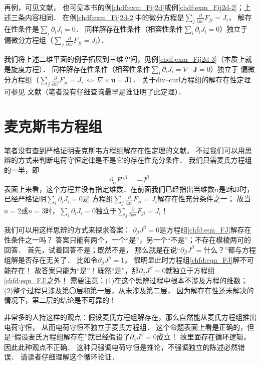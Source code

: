 再例，可见文献\parencite[p.16]{courant_hilbert-v2}，
也可见本书的例\ref{chdf:exm_Fij2d}或例\ref{chdf:exm_Fij2d-2}；上述三条内容相同．
在例\ref{chdf:exm_Fij2d-2}中的微分方程是$\sum_{j}\frac{\partial}{\partial x^j} F_{ji} = J_{i} $，
解存在性条件是$\sum_{i} \partial_i J_i = 0$．
同样解存在性条件（相容性条件$\sum_{i} \partial_i J_i = 0$）独立于
偏微分方程组（$\sum_{j}\frac{\partial}{\partial x^j} F_{ji} = J_{i} $）．


我们将上述二维平面的例子拓展到三维空间，见例\ref{chdf:exm_Fij2d-3}（本质上就是旋度方程）．
同样解存在性条件（相容性条件$\sum_{i} \partial_i J_i =\nabla \cdot \boldsymbol{J}= 0 $）独立于
偏微分方程组（$\sum_{j}\frac{\partial}{\partial x^j} F_{ji} = J_{i} {\ \Longleftrightarrow \ }
\nabla\times \boldsymbol{u} = \boldsymbol{J} $）．
关于div--curl方程组的解存在性定理可参见
文献\parencite{aramaki-2014}（笔者没有仔细查询最早是谁证明了此定理）．


\section{麦克斯韦方程组}
笔者没有查到严格证明麦克斯韦方程组解存在性定理的文献，
不过我们可以用思辨的方式来判断电荷守恒定律是不是它的存在性充分条件．
我们只需麦氏方程组的一半，即
\begin{equation}\label{chfd:eqn_FJ}
	\partial_{\alpha} F^{\alpha\beta} = - J^{\beta} .
\end{equation}
表面上来看，这个方程并没有指定维数．在前面我们已经指出当维数$n$是2和3时，
已经严格证明$\sum_{i} \partial_i J_i =0$是
方程组$\sum_{j}\frac{\partial}{\partial x^j} F_{ji} = J_{i}$解存在性充分条件之一；
故当$n=2$或$n=3$时，$\sum_{i} \partial_i J_i =0$独立于$\sum_{j}\frac{\partial}{\partial x^j} F_{ji} = J_{i}$！

我们可以用这样思辨的方式来探求答案：
$\partial_{\beta} J^{\beta}=0$是方程组\eqref{chfd:eqn_FJ}解存在性条件之一吗？
答案只能有两个，一个“是”，另一个“不是”；不存在模棱两可的回答．
首先，试着回答不是；既然不是，
那么就是在说“$\partial_{\beta} J^{\beta}=\text{什么？}$”都与方程组解是否存在无关了．
比如令$\partial_{\beta} J^{\beta}=1$，
很明显此时方程组\eqref{chfd:eqn_FJ}解不可能存在！
故答案只能为“是”！既然“是”，那$\partial_{\beta} J^{\beta}=0$就独立于方程组\eqref{chfd:eqn_FJ}之外！
需要注意：(1)在这个思辨过程中根本不涉及方程的维数；
(2)整个过程只涉及第〇层和第一层，从未涉及第二层，
因为解存在性还未解决的情况下，第二层的结论是不可靠的！


非常多的人持这样的观点：假设麦氏方程组解存在，那么自然能从麦氏方程组推出电荷守恒，
从而电荷守恒不独立于麦氏方程组．
这个命题表面上看是正确的，但是“假设麦氏方程组解存在”就已经假设了$\partial_{\beta} J^{\beta}=0$成立！
故里面存在循环逻辑，因此此种观点不正确．
这种只强调电荷守恒是推论，不强调独立的陈述必然错误．
请读者仔细理解这个循环论证．


